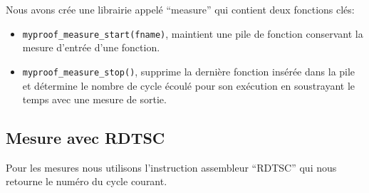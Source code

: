 Nous avons crée une librairie appelé ``measure'' qui contient deux fonctions clés:\\

\begin{itemize}

\item \verb#myproof_measure_start(fname)#, maintient une pile de fonction conservant la mesure d'entrée d'une fonction.\\

\item \verb#myproof_measure_stop()#, supprime la dernière fonction insérée dans la pile et détermine le nombre de cycle écoulé pour son exécution en soustrayant le temps avec une mesure de sortie.

\end{itemize}

\subsection{Mesure avec RDTSC}

Pour les mesures nous utilisons l'instruction assembleur ``RDTSC'' qui nous retourne le numéro du cycle courant.
